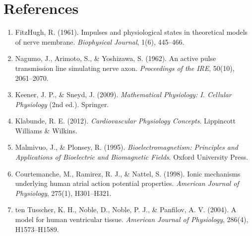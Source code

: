 \documentclass[11pt, a4paper]{article}
\begin{document}
\section{References}

\begin{enumerate}
    \item FitzHugh, R. (1961). Impulses and physiological states in theoretical models of nerve membrane. \textit{Biophysical Journal}, 1(6), 445--466.
    
    \item Nagumo, J., Arimoto, S., \& Yoshizawa, S. (1962). An active pulse transmission line simulating nerve axon. \textit{Proceedings of the IRE}, 50(10), 2061--2070.
    
    \item Keener, J. P., \& Sneyd, J. (2009). \textit{Mathematical Physiology: I. Cellular Physiology} (2nd ed.). Springer.
    
    \item Klabunde, R. E. (2012). \textit{Cardiovascular Physiology Concepts}. Lippincott Williams \& Wilkins.
    
    \item Malmivuo, J., \& Plonsey, R. (1995). \textit{Bioelectromagnetism: Principles and Applications of Bioelectric and Biomagnetic Fields}. Oxford University Press.
    
    \item Courtemanche, M., Ramirez, R. J., \& Nattel, S. (1998). Ionic mechanisms underlying human atrial action potential properties. \textit{American Journal of Physiology}, 275(1), H301--H321.
    
    \item ten Tusscher, K. H., Noble, D., Noble, P. J., \& Panfilov, A. V. (2004). A model for human ventricular tissue. \textit{American Journal of Physiology}, 286(4), H1573--H1589.
\end{enumerate}
\end{document}
